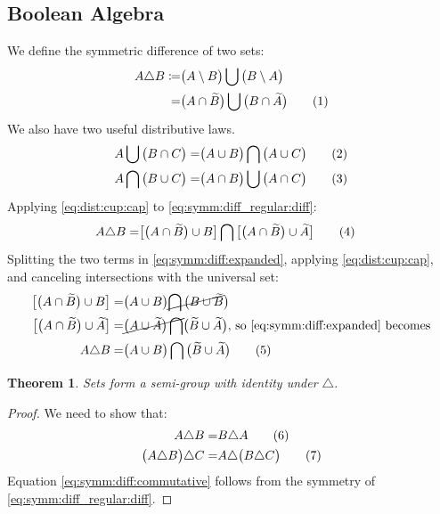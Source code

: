 \documentclass[]{article}
\newcommand\numberthis{\addtocounter{equation}{1}\tag{\theequation}}
\newcommand{\stcomp}[1]{\widetilde{#1}}
\newtheorem{thm}{Theorem}
\begin{document}
\begin{appendices}
	\section{Boolean Algebra}
	We define the symmetric difference of two sets:
	\begin{align*}
		A \triangle B \coloneqq& \big(A \setminus B\big) \bigcup \big(B \setminus  A\big)\\
		=& \big(A \cap \stcomp{B}\big) \bigcup \big(B \cap \stcomp{A}\big) \numberthis \label{eq:symm:diff_regular:diff}\\
	\end{align*}
	We also have two useful distributive laws.
	\begin{align*}
		A \bigcup \big(B \cap C \big) =& \big(A \cup B\big) \bigcap  \big(A \cup C\big) \numberthis \label{eq:dist:cup:cap}\\
		A \bigcap \big(B \cup C \big) =& \big(A \cap B\big) \bigcup  \big(A \cap C\big)	\numberthis \label{eq:dist:cap:cup}	
	\end{align*}
	Applying \eqref{eq:dist:cup:cap} to \eqref{eq:symm:diff_regular:diff}:
	\begin{align*}
		A \triangle B =&\big[\big(A \cap \stcomp{B}\big) \cup B\big] \bigcap \big[ \big(A \cap \stcomp{B}\big) \cup \stcomp A \big] \numberthis \label{eq:symm:diff:expanded}
	\end{align*}
	Splitting the two terms in \eqref{eq:symm:diff:expanded}, applying \eqref{eq:dist:cup:cap}, and canceling intersections with the universal set:
	\begin{align*}
		\big[\big(A \cap \stcomp{B}\big) \cup B\big] =& \big(A \cup B\big) \cancel{\bigcap \big(B \cup \stcomp{B}}\big)\\
		\big[ \big(A \cap \stcomp{B}\big) \cup \stcomp A \big] =& \cancel{\big(A\cup\stcomp{A} \big) \bigcap} \big(\stcomp{B} \cup\stcomp{A}\big) \text{, so \eqref{eq:symm:diff:expanded} becomes}\\
		A \triangle B =& \big(A \cup B\big) \bigcap \big(\stcomp{B} \cup\stcomp{A}\big) \numberthis \label{eq:symm:diff:without:diff}
	\end{align*}

	\begin{thm}
		Sets form a semi-group with identity under $\triangle$.
	\end{thm}
	\begin{proof}
		We need to show that:
		\begin{align*}
			A \triangle B =& B \triangle A \numberthis \label{eq:symm:diff:commutative}\\
			\big(A \triangle B\big) \triangle C =& A \triangle \big(B \triangle C\big) \numberthis \label{eq:symm:diff:associative}
		\end{align*}
		Equation \eqref{eq:symm:diff:commutative} follows from the symmetry of \eqref{eq:symm:diff_regular:diff}.
		

\end{proof}
\end{appendices}
\end{document}
